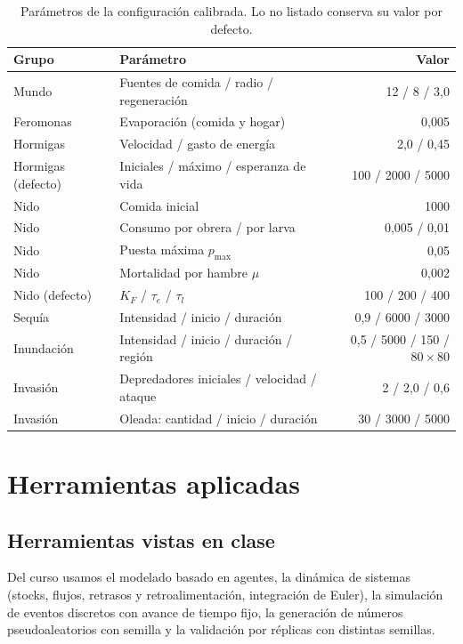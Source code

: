\documentclass[11pt,a4paper]{article}
\begin{document}
\begin{table}[H]
\centering
\caption{Parámetros de la configuración calibrada. Lo no listado conserva su valor por defecto.}
\label{tab:parametros}
\begin{tabular}{@{}llr@{}}
\toprule
\textbf{Grupo} & \textbf{Parámetro} & \textbf{Valor} \\
\midrule
Mundo & Fuentes de comida / radio / regeneración & 12 / 8 / 3,0 \\
Feromonas & Evaporación (comida y hogar) & 0,005 \\
Hormigas & Velocidad / gasto de energía & 2,0 / 0,45 \\
Hormigas (defecto) & Iniciales / máximo / esperanza de vida & 100 / 2000 / 5000 \\
Nido & Comida inicial & 1000 \\
Nido & Consumo por obrera / por larva & 0,005 / 0,01 \\
Nido & Puesta máxima $p_{\max}$ & 0,05 \\
Nido & Mortalidad por hambre $\mu$ & 0,002 \\
Nido (defecto) & $K_F$ / $\tau_e$ / $\tau_l$ & 100 / 200 / 400 \\
\midrule
Sequía & Intensidad / inicio / duración & 0,9 / 6000 / 3000 \\
Inundación & Intensidad / inicio / duración / región & 0,5 / 5000 / 150 / $80\times80$ \\
Invasión & Depredadores iniciales / velocidad / ataque & 2 / 2,0 / 0,6 \\
Invasión & Oleada: cantidad / inicio / duración & 30 / 3000 / 5000 \\
\bottomrule
\end{tabular}
\end{table}

\section{Herramientas aplicadas}

\subsection{Herramientas vistas en clase}

Del curso usamos el modelado basado en agentes, la dinámica de sistemas (stocks, flujos, retrasos y retroalimentación, integración de Euler), la simulación de eventos discretos con avance de tiempo fijo, la generación de números pseudoaleatorios con semilla y la validación por réplicas con distintas semillas.
\end{document}
